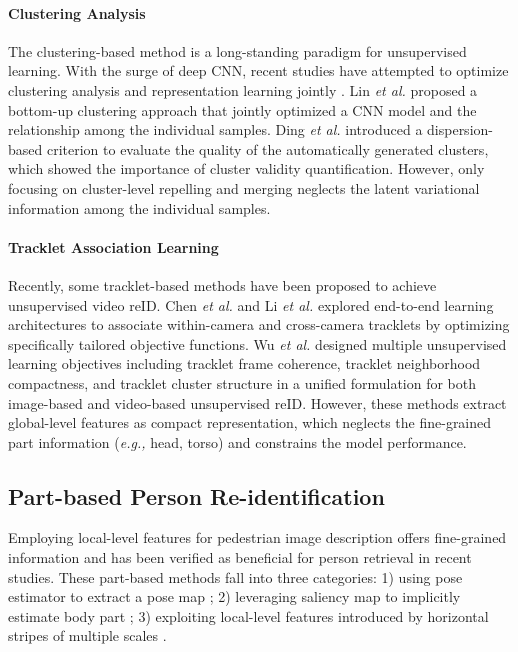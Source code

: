 \documentclass{cta-author}
\begin{document}
	\paragraph{Clustering Analysis}
	The clustering-based method is a long-standing paradigm for unsupervised learning. With the surge of deep CNN, recent studies have attempted to optimize clustering analysis and representation learning jointly \cite{RN247} \cite{RN118}. Lin \textit{et al.} \cite{RN247} proposed a bottom-up clustering approach that jointly optimized a CNN model and the relationship among the individual samples. Ding \textit{et al.} \cite{RN118} introduced a dispersion-based criterion to evaluate the quality of the automatically generated clusters, which showed the importance of cluster validity quantification. However, only focusing on cluster-level repelling and merging neglects the latent variational information among the individual samples.
	
	\paragraph{Tracklet Association Learning}
	Recently, some tracklet-based methods \cite{RN87} \cite{RN369} \cite{RN389} have been proposed to achieve unsupervised video reID. Chen \textit{et al.} \cite{RN87} and Li \textit{et al.} \cite{RN369} explored end-to-end learning architectures to associate within-camera and cross-camera tracklets by optimizing specifically tailored objective functions. Wu \textit{et al.} \cite{RN389} designed multiple unsupervised learning objectives including tracklet frame coherence, tracklet neighborhood compactness, and tracklet cluster structure in a unified formulation for both image-based and video-based unsupervised reID. However, these methods extract global-level features as compact representation, which neglects the fine-grained part information (\textit{e.g.,} head, torso) and constrains the model performance.
	
	\subsection{Part-based Person Re-identification}
	Employing local-level features for pedestrian image description offers fine-grained information and has been verified as beneficial for person retrieval in recent studies. These part-based methods fall into three categories: 1) using pose estimator to extract a pose map \cite{RN265}; 2) leveraging saliency map to implicitly estimate body part \cite{RN266}; 3) exploiting local-level features introduced by horizontal stripes of multiple scales \cite{RN191} \cite{RN318} \cite{RN394} \cite{RN314} \cite{RN98}. 
	
\end{document}
